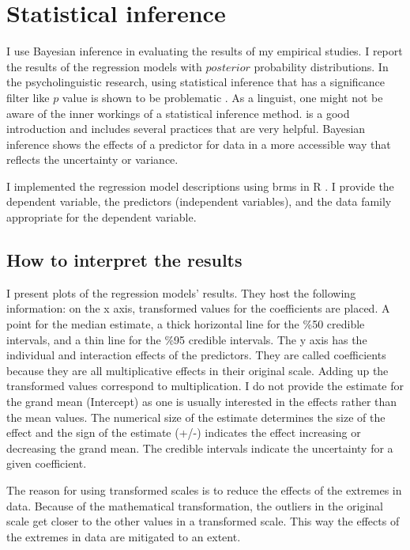 \section{Statistical inference}

I use Bayesian inference in evaluating the results of my empirical studies. I report the results of the regression models with $posterior$ probability distributions. In the psycholinguistic research, using statistical inference that has a significance filter like $p$ value is shown to be problematic \citep{vasishth2018statistical, wagenmakers2007practical,kruschke2011bayesian}. As a linguist, one might not be aware of the inner workings of a statistical inference method. \citet{mcelreath2020statistical} is a good introduction and includes several practices that are very helpful. Bayesian inference shows the effects of a predictor for data in a more accessible way that reflects the uncertainty or variance. 

I implemented the regression model descriptions using brms \citep{burkner2017brms} in R \citep{team2013r}. I provide the dependent variable, the predictors (independent variables), and the data family appropriate for the dependent variable. 

\subsection{How to interpret the results}

I present plots of the regression models' results. They host the following information: on the x axis, transformed values for the coefficients are placed. A point for the median estimate, a thick horizontal line for the \%50 credible intervals, and a thin line for the \%95 credible intervals. The y axis has the individual and interaction effects of the predictors. They are called coefficients because they are all multiplicative effects in their original scale. Adding up the transformed values correspond to multiplication. I do not provide the estimate for the grand mean (Intercept) as one is usually interested in the effects rather than the mean values. The numerical size of the estimate determines the size of the effect and the sign of the estimate (+/-) indicates the effect increasing or decreasing the grand mean. The credible intervals indicate the uncertainty for a given coefficient.

The reason for using transformed scales is to reduce the effects of the extremes in data. Because of the mathematical transformation, the outliers in the original scale get closer to the other values in a transformed scale. This way the effects of the extremes in data are mitigated to an extent.

